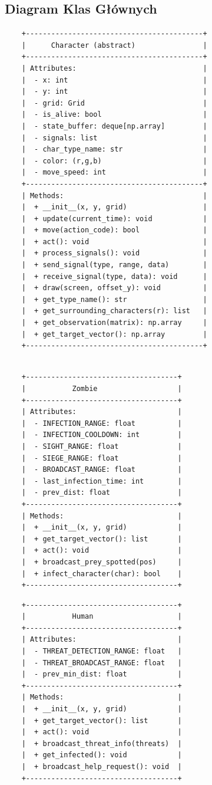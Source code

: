 \documentclass[12pt,a4paper]{article}
\begin{document}
\subsection{Diagram Klas Głównych}

\begin{verbatim}
	+------------------------------------------+
	|      Character (abstract)                |
	+------------------------------------------+
	| Attributes:                              |
	|  - x: int                                |
	|  - y: int                                |
	|  - grid: Grid                            |
	|  - is_alive: bool                        |
	|  - state_buffer: deque[np.array]         |
	|  - signals: list                         |
	|  - char_type_name: str                   |
	|  - color: (r,g,b)                        |
	|  - move_speed: int                       |
	+------------------------------------------+
	| Methods:                                 |
	|  + __init__(x, y, grid)                  |
	|  + update(current_time): void            |
	|  + move(action_code): bool               |
	|  + act(): void                           |
	|  + process_signals(): void               |
	|  + send_signal(type, range, data)        |
	|  + receive_signal(type, data): void      |
	|  + draw(screen, offset_y): void          |
	|  + get_type_name(): str                  |
	|  + get_surrounding_characters(r): list   |
	|  + get_observation(matrix): np.array     |
	|  + get_target_vector(): np.array         |
	+------------------------------------------+
\end{verbatim}
\begin{verbatim}

	+------------------------------------+
	|           Zombie                   |
	+------------------------------------+
	| Attributes:                        |
	|  - INFECTION_RANGE: float          |
	|  - INFECTION_COOLDOWN: int         |
	|  - SIGHT_RANGE: float              |
	|  - SIEGE_RANGE: float              |
	|  - BROADCAST_RANGE: float          |
	|  - last_infection_time: int        |
	|  - prev_dist: float                |
	+------------------------------------+
	| Methods:                           |
	|  + __init__(x, y, grid)            |
	|  + get_target_vector(): list       |
	|  + act(): void                     |
	|  + broadcast_prey_spotted(pos)     |
	|  + infect_character(char): bool    |
	+------------------------------------+
\end{verbatim}
\begin{verbatim}
	+------------------------------------+
	|           Human                    |
	+------------------------------------+
	| Attributes:                        |
	|  - THREAT_DETECTION_RANGE: float   |
	|  - THREAT_BROADCAST_RANGE: float   |
	|  - prev_min_dist: float            |
	+------------------------------------+
	| Methods:                           |
	|  + __init__(x, y, grid)            |
	|  + get_target_vector(): list       |
	|  + act(): void                     |
	|  + broadcast_threat_info(threats)  |
	|  + get_infected(): void            |
	|  + broadcast_help_request(): void  |
	+------------------------------------+
\end{verbatim}
\end{document}
